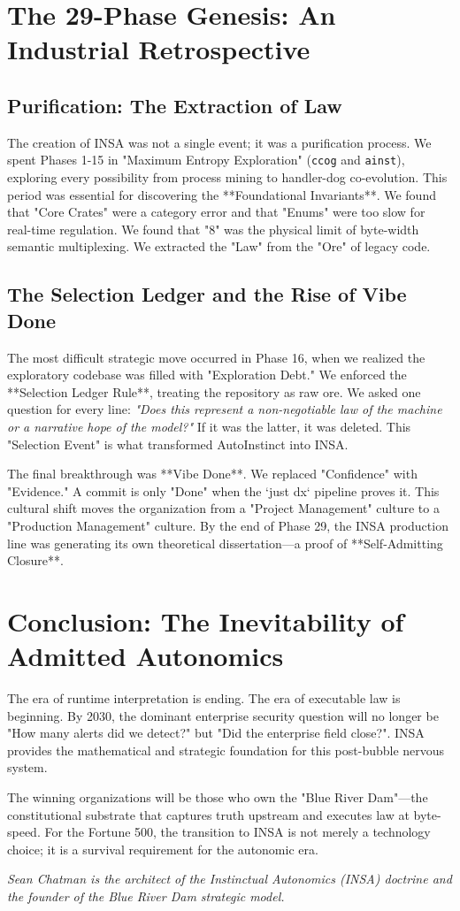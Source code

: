 \documentclass[12pt,a4paper,oneside]{book}
\begin{document}
\chapter{The 29-Phase Genesis: An Industrial Retrospective}

\section{Purification: The Extraction of Law}
The creation of INSA was not a single event; it was a purification process. We spent Phases 1-15 in "Maximum Entropy Exploration" (\texttt{ccog} and \texttt{ainst}), exploring every possibility from process mining to handler-dog co-evolution. This period was essential for discovering the **Foundational Invariants**. We found that "Core Crates" were a category error and that "Enums" were too slow for real-time regulation. We found that "8" was the physical limit of byte-width semantic multiplexing. We extracted the "Law" from the "Ore" of legacy code.

\section{The Selection Ledger and the Rise of Vibe Done}
The most difficult strategic move occurred in Phase 16, when we realized the exploratory codebase was filled with "Exploration Debt." We enforced the **Selection Ledger Rule**, treating the repository as raw ore. We asked one question for every line: \textit{"Does this represent a non-negotiable law of the machine or a narrative hope of the model?"} If it was the latter, it was deleted. This "Selection Event" is what transformed AutoInstinct into INSA.

The final breakthrough was **Vibe Done**. We replaced "Confidence" with "Evidence." A commit is only "Done" when the `just dx` pipeline proves it. This cultural shift moves the organization from a "Project Management" culture to a "Production Management" culture. By the end of Phase 29, the INSA production line was generating its own theoretical dissertation---a proof of **Self-Admitting Closure**.

\chapter{Conclusion: The Inevitability of Admitted Autonomics}
The era of runtime interpretation is ending. The era of executable law is beginning. By 2030, the dominant enterprise security question will no longer be "How many alerts did we detect?" but "Did the enterprise field close?". INSA provides the mathematical and strategic foundation for this post-bubble nervous system.

The winning organizations will be those who own the "Blue River Dam"---the constitutional substrate that captures truth upstream and executes law at byte-speed. For the Fortune 500, the transition to INSA is not merely a technology choice; it is a survival requirement for the autonomic era.

\textit{Sean Chatman is the architect of the Instinctual Autonomics (INSA) doctrine and the founder of the Blue River Dam strategic model.}
\end{document}
